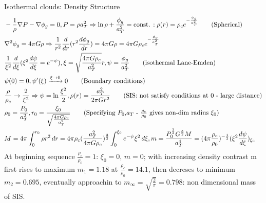 \begin{frame}{Isothermal clouds: Density Structure}
    \begin{align*}
        &-\frac{1}{\rho}\nabla P-\nabla\phi_g=0, P=\rho a_T^2\Rightarrow \ln{\rho}+\frac{\phi_g}{a_T^2}=\const{}: \rho(r)=\rho_c\exp{-\frac{\phi_g}{a_T^2}}\tag{Spherical}\\
        &\nabla^2\phi_g=4\pi G\rho\Rightarrow \frac{1}{r^2}\TDof{r}(r^2\TDy{r}{\phi_g})=4\pi G\rho=4\pi G\rho_c\exp{-\frac{\phi_g}{a_T^2}}\\
        &\frac{1}{\xi^2}\TDof{\xi}(\xi^2\TDy{\xi}{\psi}=\exp{-\psi}),\xi=\sqrt{\frac{4\pi G\rho_c}{a_T^2}}r,\psi=\frac{\phi_g}{a_T^2}\tag{isothermal Lane-Emden}\\
        &\psi(0)=0,\psi'(\xi)\xrightarrow{\xi\to0}0\tag{Boundary conditions}\\
        &\frac{\rho}{\rho_c}\to\frac{2}{\xi^2}\Rightarrow\psi=\ln{\frac{\xi^2}{2}}, \rho(r)=\frac{a_T^2}{2\pi Gr^2}\tag{SIS: not satisfy conditions at 0 - large distance}\\
        &\rho_0=\frac{P_0}{a_T^2},r_0=\frac{\xi_0}{\sqrt{\frac{4\pi G\rho_c}{a_T^2}}}\tag{Specifying $P_0$,$a_T$ - $\frac{\rho_c}{\rho_0}$ gives non-dim radius $\xi_0$}\\
        &M=4\pi\int_0^{r_0}\rho r^2\,dr=4\pi\rho_c(\frac{a_T^2}{4\pi G\rho_c})^{\frac{3}{2}}\int_0^{\xi_0}\exp{-\psi}\xi^2\,d\xi,m=\frac{P_0^{\frac{1}{2}}G^{\frac{3}{2}}M}{a_T^4}=(4\pi \frac{\rho_c}{\rho_0})^{-\frac{1}{2}}(\xi^2\TDy{\xi}{\psi})_{\xi_0}
        \end{align*}
        At beginning sequence $\frac{\rho_c}{\rho_0}=1$: $\xi_0=0$, $m=0$; with increasing density contrast m first rises to maximum $m_1=1.18$ at $\frac{\rho_c}{\rho_0}=14.1$, then decreses to minimum $m_2=0.695$, eventually approachin to $m_{\infty}=\sqrt{\frac{2}{\pi}}=0.798$: non dimensional mass of SIS.
    \end{frame}

